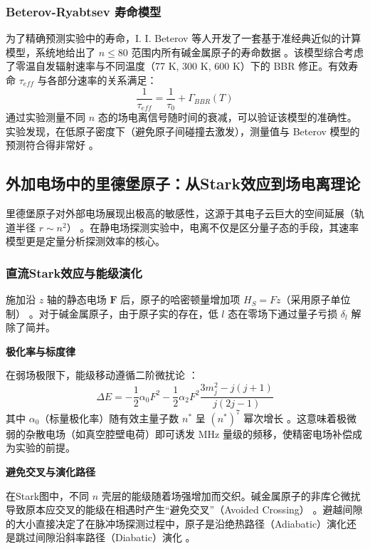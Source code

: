 \documentclass[../main.tex]{subfiles}
\begin{document}
\subsubsection{Beterov-Ryabtsev 寿命模型}

为了精确预测实验中的寿命，I. I. Beterov 等人\cite{beterov2009quasiclassical}开发了一套基于准经典近似的计算模型，系统地给出了 $n \leq 80$ 范围内所有碱金属原子的寿命数据 。该模型综合考虑了零温自发辐射速率与不同温度（77 K, 300 K, 600 K）下的 BBR 修正。有效寿命 $\tau_{eff}$ 与各部分速率的关系满足：
\begin{equation}
\frac{1}{\tau_{eff}} = \frac{1}{\tau_0} + \Gamma_{BBR}(T)
\end{equation}
通过实验测量不同 $n$ 态的场电离信号随时间的衰减，可以验证该模型的准确性。实验发现，在低原子密度下（避免原子间碰撞去激发），测量值与 Beterov 模型的预测符合得非常好 。

\subsection{外加电场中的里德堡原子：从Stark效应到场电离理论}

里德堡原子对外部电场展现出极高的敏感性，这源于其电子云巨大的空间延展（轨道半径 $r \sim n^2$） 。在静电场探测实验中，电离不仅是区分量子态的手段，其速率模型更是定量分析探测效率的核心。

\subsubsection{直流Stark效应与能级演化}

施加沿 $z$ 轴的静态电场 $\mathbf{F}$ 后，原子的哈密顿量增加项 $H_S = Fz$（采用原子单位制） 。对于碱金属原子，由于原子实的存在，低 $l$ 态在零场下通过量子亏损 $\delta_l$ 解除了简并。

\textbf{极化率与标度律}

在弱场极限下，能级移动遵循二阶微扰论 ：
\begin{equation}
\Delta E = -\frac{1}{2} \alpha_0 F^2 - \frac{1}{2} \alpha_2 F^2 \frac{3m_j^2 - j(j+1)}{j(2j-1)}
\end{equation}
其中 $\alpha_0$（标量极化率）随有效主量子数 $n^*$ 呈 $(n^*)^7$ 幂次增长 。这意味着极微弱的杂散电场（如真空腔壁电荷）即可诱发 MHz 量级的频移，使精密电场补偿成为实验的前提。

\textbf{避免交叉与演化路径}

在Stark图中，不同 $n$ 壳层的能级随着场强增加而交织。碱金属原子的非库仑微扰导致原本应交叉的能级在相遇时产生“避免交叉”（Avoided Crossing） 。避越间隙的大小直接决定了在脉冲场探测过程中，原子是沿绝热路径（Adiabatic）演化还是跳过间隙沿斜率路径（Diabatic）演化 。
\end{document}
